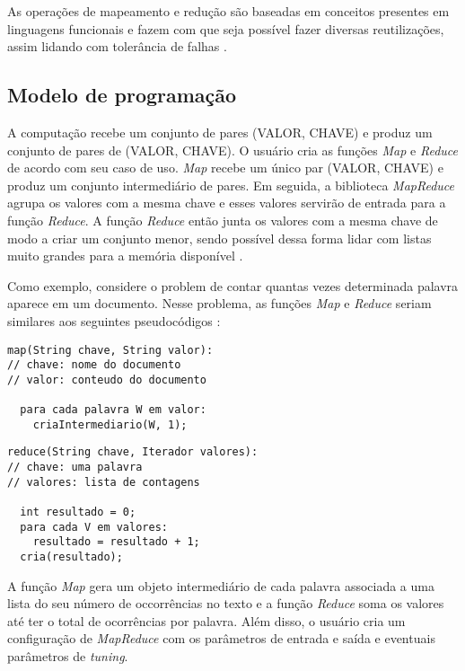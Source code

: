 As operações de mapeamento e redução são baseadas em conceitos presentes em linguagens funcionais e fazem com que seja possível fazer diversas reutilizações, assim lidando com tolerância de falhas \cite{MapReduce08}. 

\subsection{Modelo de programação}\label{ssec:mapreducemodelo}

A computação recebe um conjunto de pares (VALOR, CHAVE) e produz um conjunto de pares de (VALOR, CHAVE). O usuário cria as funções \textit{Map} e \textit{Reduce} de acordo com seu caso de uso. \textit{Map} recebe um único par (VALOR, CHAVE) e produz um conjunto intermediário de pares. Em seguida, a biblioteca \textit{MapReduce} agrupa os valores com a mesma chave e esses valores servirão de entrada para a função \textit{Reduce}. A função \textit{Reduce} então junta os valores com a mesma chave de modo a criar um conjunto menor, sendo possível dessa forma lidar com listas muito grandes para a memória disponível \cite{MapReduce08}.

Como exemplo, considere o problem de contar quantas vezes determinada palavra aparece em um documento. Nesse problema, as funções \textit{Map} e \textit{Reduce} seriam similares aos seguintes pseudocódigos \cite{MapReduce08}:

\begin{lstlisting}[title={Código 1: Exemplo de função Map em pseudocódigo adaptado de \cite{MapReduce08}}]
map(String chave, String valor):
// chave: nome do documento
// valor: conteudo do documento

  para cada palavra W em valor:
    criaIntermediario(W, 1);
\end{lstlisting}

\begin{lstlisting}[title={Código 2: Exemplo de função Reduce em pseudocódigo adaptado de \cite{MapReduce08}}]
reduce(String chave, Iterador valores):
// chave: uma palavra
// valores: lista de contagens

  int resultado = 0;
  para cada V em valores:
    resultado = resultado + 1;
  cria(resultado);
\end{lstlisting}

A função \textit{Map} gera um objeto intermediário de cada palavra associada a uma lista do seu número de occorrências no texto e a função \textit{Reduce} soma os valores até ter o total de ocorrências por palavra. Além disso, o usuário cria um configuração de \textit{MapReduce} com os parâmetros de entrada e saída e eventuais parâmetros de \textit{tuning}.

